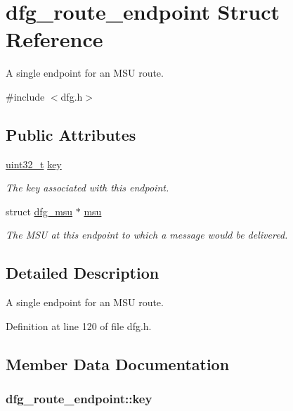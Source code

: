 \hypertarget{structdfg__route__endpoint}{\section{dfg\-\_\-route\-\_\-endpoint Struct Reference}
\label{structdfg__route__endpoint}
}


A single endpoint for an M\-S\-U route.  




{\ttfamily \#include $<$dfg.\-h$>$}

\subsection*{Public Attributes}
\begin{DoxyCompactItemize}
\item 
\hyperlink{msus_2webserver_2uthash_8h_a435d1572bf3f880d55459d9805097f62}{uint32\-\_\-t} \hyperlink{structdfg__route__endpoint_acff408d5be032f79f7927abf4568b8ea}{key}
\begin{DoxyCompactList}\small\item\em The key associated with this endpoint. \end{DoxyCompactList}\item 
struct \hyperlink{structdfg__msu}{dfg\-\_\-msu} $\ast$ \hyperlink{structdfg__route__endpoint_aa05dabbb8629dbf8d032ef0d4f304e4d}{msu}
\begin{DoxyCompactList}\small\item\em The M\-S\-U at this endpoint to which a message would be delivered. \end{DoxyCompactList}\end{DoxyCompactItemize}


\subsection{Detailed Description}
A single endpoint for an M\-S\-U route. 

Definition at line 120 of file dfg.\-h.



\subsection{Member Data Documentation}
\hypertarget{structdfg__route__endpoint_acff408d5be032f79f7927abf4568b8ea}{
\subsubsection[{key}]{ dfg\-\_\-route\-\_\-endpoint\-::key}}\label{structdfg__route__endpoint_acff408d5be032f79f7927abf4568b8ea}


